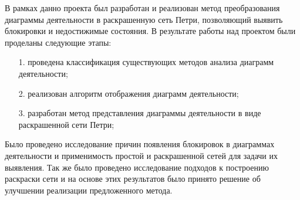 \Conclusion

В рамках данно проекта был разработан и реализован метод преобразования диаграммы деятельности в раскрашенную сеть Петри, позволяющий выявить блокировки и недостижимые состояния. В результате работы над проектом были проделаны следующие этапы:
\begin{enumerate}
\item[1.] проведена классификация существующих методов анализа диаграмм деятельности;
\item[2.] реализован алгоритм отображения диаграмм деятельности;
\item[3.] разработан метод представления диаграммы деятельности в виде раскрашенной сети Петри;
\end{enumerate}

Было проведено исследование причин появления блокировок в диаграммах деятельности и применимость простой и раскрашенной сетей для задачи их выявления. Так же было проведено исследование подходов к построению раскраски сети и на основе этих результатов было принято решение об улучшении реализации предложенного метода.